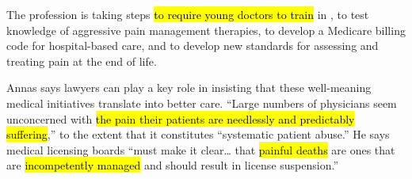 The profession is taking steps \hl{to require young doctors to train} in 
, to test knowledge of aggressive pain management therapies, to develop a Medicare billing 
code for hospital-based care, and to develop new standards for assessing and treating pain at the end of life.

Annas says lawyers can play a key role in insisting that these well-meaning medical initiatives translate into better care. “Large numbers of physicians seem unconcerned with 
 \hl{the pain their patients are needlessly and predictably suffering},” to the extent that it constitutes “systematic patient abuse.” He says medical licensing boards “must make it clear… that 
\hl{painful deaths} are 
 ones that are 
\hl{incompetently managed} and should result in 
license suspension.”

